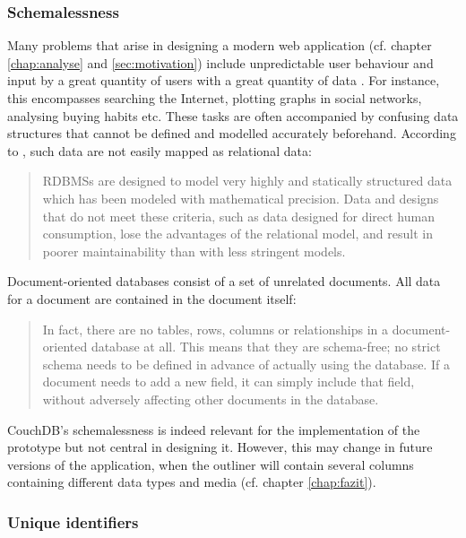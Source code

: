 \subsubsection{Schemalessness}

Many problems that arise in designing a modern web application (cf. chapter \ref{chap:analyse} and \ref{sec:motivation}) include unpredictable user behaviour and input by a great quantity of users with a great quantity of data . For instance, this encompasses searching the Internet, plotting graphs in social networks, analysing buying habits etc. These tasks are often accompanied by confusing data structures that cannot be defined and modelled accurately beforehand. According to \cite{nobah}, such data are not easily mapped as relational data:

\begin{quote}
RDBMSs are designed to model very highly and statically structured data which has been modeled with mathematical precision. Data and designs that do not meet these criteria, such as data designed for direct human consumption, lose the advantages of the relational model, and result in poorer maintainability than with less stringent models. 
\end{quote}

Document-oriented databases consist of a set of unrelated documents. All data for a document are contained in the document itself:

\begin{quote}
In fact, there are no tables, rows, columns or relationships in a document-oriented database at all. This means that they are schema-free; no strict schema needs to be defined in advance of actually using the database. If a document needs to add a new field, it can simply include that field, without adversely affecting other documents in the database. \cite{couchdb:ibm} 
\end{quote}

CouchDB's schemalessness is indeed relevant for the implementation of the prototype but not central in designing it. However, this may change in future versions of the application, when the outliner will contain several columns containing different data types and media (cf. chapter \ref{chap:fazit}).

\subsubsection{Unique identifiers}


